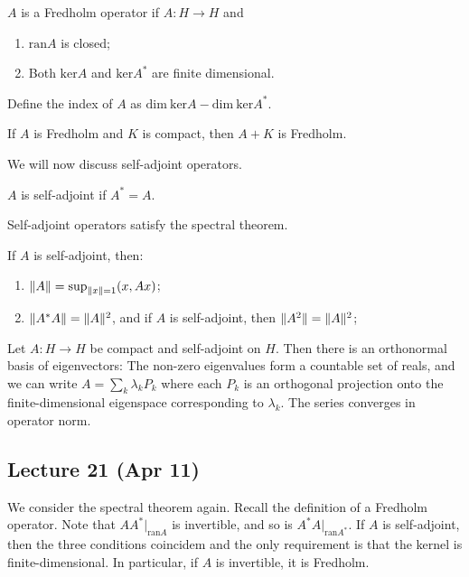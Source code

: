 \documentclass[10pt, twoside]{article}
\begin{document}
    \begin{defn} $A$ is a Fredholm operator if $A:H \to H$ and
    \begin{enumerate} \item $\mathrm{ran}A$ is closed; \item Both
    $\mathrm{ker}A$ and $\mathrm{ker}A^*$ are finite dimensional.
    \end{enumerate} Define the index of $A$ as $\mathrm{dim}\ \mathrm{ker} A -
    \mathrm{dim}\ \mathrm{ker}A^*$.  \end{defn}

    \begin{prop} If $A$ is Fredholm and $K$ is compact, then $A+K$ is Fredholm.
    \end{prop}

    We will now discuss self-adjoint operators.  \begin{defn} $A$ is
    self-adjoint if $A^* = A$.  \end{defn} Self-adjoint operators satisfy the
    spectral theorem.

    \begin{lem} If $A$ is self-adjoint, then: \begin{enumerate} \item $\lVert A\rVert
    = \sup_{\lVert x\rVert = 1} (x,Ax)$; \item $\lVert A^*A\rVert = \lVert A\rVert^2$, and if $A$
    is self-adjoint, then $\lVert A^2\rVert = \lVert A\rVert^2$; \end{enumerate} \end{lem}

    \begin{thm} Let $A: H \to H$ be compact and
        self-adjoint on $H$. Then there is an orthonormal basis of
        eigenvectors: The non-zero eigenvalues form a countable set of reals,
        and we can write $A = \sum_k \lambda_k P_k$ where each $P_k$ is an
        orthogonal projection onto the finite-dimensional eigenspace
        corresponding to $\lambda_k$. The series converges in operator norm.
    \end{thm}

    \subsection{Lecture 21 (Apr 11)} We consider the spectral theorem again.
    Recall the definition of a Fredholm operator. Note that
    $AA^*|_{\mathrm{ran}A}$ is invertible, and so is $A^*A|_{\mathrm{ran}A^*}$.
    If $A$ is self-adjoint, then the three conditions coincidem and the only
    requirement is that the kernel is finite-dimensional. In particular, if $A$
    is invertible, it is Fredholm.
\end{document}
